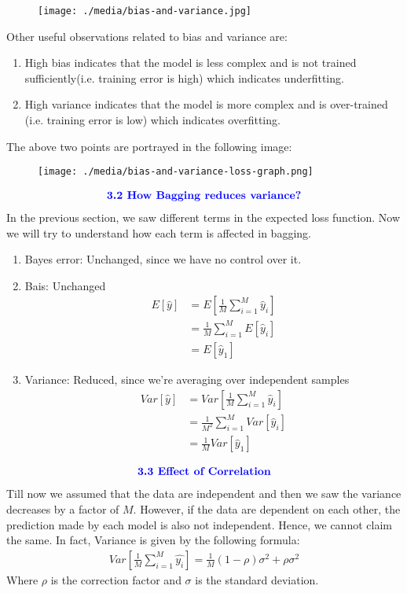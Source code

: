 \documentclass{homework}
\begin{document}
\begin{figure}[!ht]
    \centering
    \texttt{[image: ./media/bias-and-variance.jpg]}
\end{figure}
\newpage
Other useful observations related to bias and variance are:
\begin{enumerate}
    \item High bias indicates that the model is less complex and is not trained sufficiently(i.e. training error is high) which indicates underfitting.
    \item High variance indicates that the model is more complex and is over-trained (i.e. training error is low) which indicates overfitting.
\end{enumerate}
The above two points are portrayed in the following image:
\begin{figure}[!ht]
    \centering
    \texttt{[image: ./media/bias-and-variance-loss-graph.png]}
\end{figure}
\begin{align*}
    \textcolor{blue}{ \text{{\textbf{3.2 How Bagging reduces variance?}}}}
 \end{align*}
In the previous section, we saw different terms in the expected loss function. Now we will try to understand how each term is affected in bagging.
\begin{enumerate}
    \item Bayes error: Unchanged, since we have no control over it.
    \item Bais: Unchanged
        \begin{align*}
            E[\hat{y}] &= E[\frac{1}{M}\sum_{i=1}^{M}\hat{y}_i] \\
                &= \frac{1}{M}\sum_{i=1}^ME[\hat{y}_i] \\
                &= E[\hat{y}_1]
        \end{align*}
    \item Variance: Reduced, since we're averaging over independent
    samples
        \begin{align*}
            Var[\hat{y}] &= Var[\frac{1}{M}\sum_{i=1}^{M}\hat{y}_i] \\
                &= \frac{1}{M^2}\sum_{i=1}^{M} Var[\hat{y}_i] \\
                &= \frac{1}{M}Var[\hat{y}_1]
        \end{align*}
\end{enumerate}
\begin{align*}
    \textcolor{blue}{ \text{{\textbf{3.3 Effect of Correlation}}}}
 \end{align*}
Till now we assumed that the data are independent and then we saw the variance decreases by a factor of $M$. However, if the data are dependent on each other, the prediction made by each model is also not independent. Hence, we cannot claim the same. In fact, Variance is given by the following formula:
\begin{align*}
    Var[\frac{1}{M}\sum_{i=1}^{M}\hat{y_i}] = \frac{1}{M}(1-\rho)\sigma^2 + \rho\sigma^2
\end{align*}
Where $\rho$ is the correction factor and $\sigma$ is the standard deviation.
\end{document}
